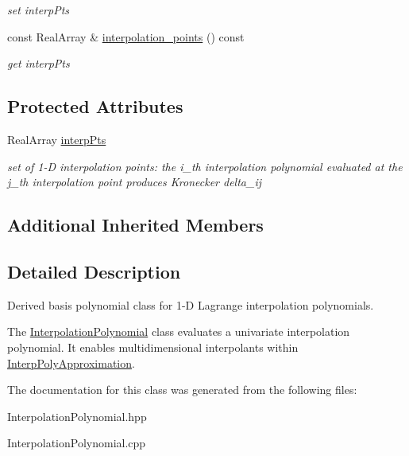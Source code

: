 \begin{DoxyCompactItemize}
\begin{DoxyCompactList}\small\item\em set interp\+Pts \end{DoxyCompactList}\item 
const Real\+Array \& \hyperlink{classPecos_1_1InterpolationPolynomial_af8e63614c42281644c4c0e099fb3e1f8}{interpolation\+\_\+points} () const \label{classPecos_1_1InterpolationPolynomial_af8e63614c42281644c4c0e099fb3e1f8}

\begin{DoxyCompactList}\small\item\em get interp\+Pts \end{DoxyCompactList}\end{DoxyCompactItemize}
\subsection*{Protected Attributes}
\begin{DoxyCompactItemize}
\item 
Real\+Array \hyperlink{classPecos_1_1InterpolationPolynomial_ae944308ccb32a77df689397d462470b4}{interp\+Pts}\label{classPecos_1_1InterpolationPolynomial_ae944308ccb32a77df689397d462470b4}

\begin{DoxyCompactList}\small\item\em set of 1-\/D interpolation points\+: the i\+\_\+th interpolation polynomial evaluated at the j\+\_\+th interpolation point produces Kronecker delta\+\_\+ij \end{DoxyCompactList}\end{DoxyCompactItemize}
\subsection*{Additional Inherited Members}


\subsection{Detailed Description}
Derived basis polynomial class for 1-\/D Lagrange interpolation polynomials. 

The \hyperlink{classPecos_1_1InterpolationPolynomial}{Interpolation\+Polynomial} class evaluates a univariate interpolation polynomial. It enables multidimensional interpolants within \hyperlink{classPecos_1_1InterpPolyApproximation}{Interp\+Poly\+Approximation}. 

The documentation for this class was generated from the following files\+:\begin{DoxyCompactItemize}
\item 
Interpolation\+Polynomial.\+hpp\item 
Interpolation\+Polynomial.\+cpp\end{DoxyCompactItemize}
